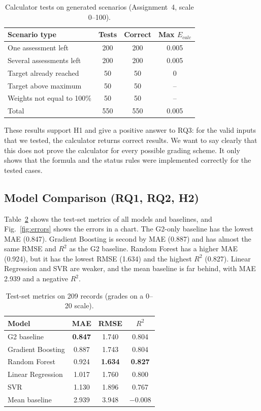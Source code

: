 \documentclass[10pt,twocolumn,a4paper]{article}
\begin{document}
\begin{table}[t]
\centering
\caption{Calculator tests on generated scenarios (Assignment~4, scale 0--100).}
\label{tab:calc550}
\small
\begin{tabular}{lccc}
\toprule
\textbf{Scenario type} & \textbf{Tests} & \textbf{Correct} & \textbf{Max $E_{calc}$}\\
\midrule
One assessment left & 200 & 200 & 0.005\\
Several assessments left & 200 & 200 & 0.005\\
Target already reached & 50 & 50 & 0\\
Target above maximum & 50 & 50 & --\\
Weights not equal to 100\% & 50 & 50 & --\\
\midrule
Total & 550 & 550 & 0.005\\
\bottomrule
\end{tabular}
\end{table}

These results support H1 and give a positive answer to RQ3: for the valid inputs that we tested, the calculator returns correct results. We want to say clearly that this does not prove the calculator for every possible grading scheme. It only shows that the formula and the status rules were implemented correctly for the tested cases.

\subsection{Model Comparison (RQ1, RQ2, H2)}
Table~\ref{tab:models} shows the test-set metrics of all models and baselines, and Fig.~\ref{fig:errors} shows the errors in a chart. The G2-only baseline has the lowest MAE (0.847). Gradient Boosting is second by MAE (0.887) and has almost the same RMSE and $R^2$ as the G2 baseline. Random Forest has a higher MAE (0.924), but it has the lowest RMSE (1.634) and the highest $R^2$ (0.827). Linear Regression and SVR are weaker, and the mean baseline is far behind, with MAE 2.939 and a negative $R^2$.

\begin{table}[t]
\centering
\caption{Test-set metrics on 209 records (grades on a 0--20 scale).}
\label{tab:models}
\small
\begin{tabular}{lccc}
\toprule
\textbf{Model} & \textbf{MAE} & \textbf{RMSE} & \textbf{$R^2$}\\
\midrule
G2 baseline & \textbf{0.847} & 1.740 & 0.804\\
Gradient Boosting & 0.887 & 1.743 & 0.804\\
Random Forest & 0.924 & \textbf{1.634} & \textbf{0.827}\\
Linear Regression & 1.017 & 1.760 & 0.800\\
SVR & 1.130 & 1.896 & 0.767\\
Mean baseline & 2.939 & 3.948 & $-0.008$\\
\bottomrule
\end{tabular}
\end{table}
\end{document}
